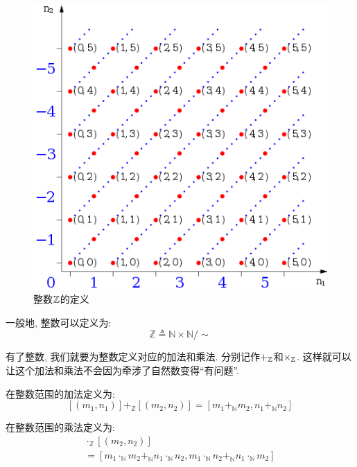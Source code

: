 \begin{figure}
	\centering
	\includegraphics[scale=0.5]{3-set-theory/figs/ndef}
	
	\caption{整数$\mathbb{Z}$的定义}
	\label{fig:zdef}
\end{figure}

\begin{definition}[$\mathbb{Z}$]
一般地, 整数可以定义为: 
  \[
    \mathbb{Z} \triangleq \mathbb{N} \times \mathbb{N}/\sim
  \]
\end{definition}

有了整数, 我们就要为整数定义对应的加法和乘法. 分别记作$+_{\mathbb{Z}}$和$\times_{\mathbb{Z}}$. 这样就可以让这个加法和乘法不会因为牵涉了自然数变得``有问题''. 

\begin{definition}[$+_\mathbb{Z}$]
在整数范围的加法定义为: 
  \[
    [(m_1, n_1)] +_{\mathbb{Z}} [(m_2, n_2)] = [m_1 +_{\mathbb{N}} m_2, n_1 +_{\mathbb{N}} n_2]
  \]
\end{definition}

\begin{definition}
在整数范围的乘法定义为: 
  \begin{gather*}
    [(m_1, n_1)] \cdot_{\mathbb{Z}} [(m_2, n_2)] \\
    = [m_1 \cdot_{\mathbb{N}} m_2 +_{\mathbb{N}} n_1 \cdot_{\mathbb{N}} n_2,
       m_1 \cdot_{\mathbb{N}} n_2 +_{\mathbb{N}} n_1 \cdot_{\mathbb{N}} m_2]
  \end{gather*}
\end{definition}

